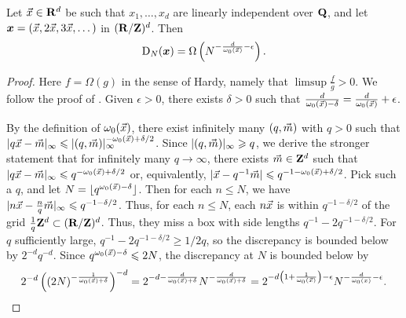 \begin{theorem}
Let $\vec{x}\in \mathbf{R}^d$ be such that $x_1,\dots,x_d$ are linearly independent over 
$\mathbf{Q}$, and let ${\boldsymbol x}=(\vec{x},2\vec{x},3\vec{x},\dots)$ in $(\mathbf{R}/\mathbf{Z})^d$. Then 
\[
	\operatorname{D}_N({\boldsymbol x}) = \Omega\left(N^{-\frac{d}{\omega_0(\vec{x})}-\epsilon} \right).
\]
\end{theorem}
\begin{proof}
Here $f=\Omega(g)$ in the sense of Hardy, namely that $\limsup \frac f g>0$. We 
follow the proof of \cite[Ch.~2, Th.~3.3]{kuipers-niederreiter-1974}. Given 
$\epsilon>0$, there exists $\delta>0$ such that 
$\frac{d}{\omega_0(\vec{x})-\delta} = \frac{d}{\omega_0(\vec{x})} + \epsilon$. 

By the definition of $\omega_0(\vec{x})$, there exist infinitely many 
$(q,\vec{m})$ with $q>0$ such that 
$|q \vec{x} - \vec{m}|_\infty \leqslant |(q,\vec{m})|_\infty^{-\omega_0(\vec{x})+\delta/2}$. 
Since $|(q,\vec{m})|_\infty \geqslant q$, we derive the stronger 
statement that for infinitely many $q\to \infty$, there exists 
$\vec{m}\in \mathbf{Z}^d$ such that 
$|q \vec{x}-\vec{m}|_\infty \leqslant q^{-\omega_0(\vec{x})+\delta/2}$ or, equivalently, 
$|\vec{x}-q^{-1}\vec{m}| \leqslant q^{-1-\omega_0(\vec{x})+\delta/2}$. Pick such a $q$, and 
let $N=\lfloor q^{\omega_0(\vec{x})-\delta}\rfloor$. Then for each $n\leqslant N$, we 
have $|n \vec{x} - \frac n q \vec{m}|_\infty \leqslant q^{-1-\delta/2}$. Thus, for each 
$n\leqslant N$, each $n \vec{x}$ is within $q^{-1-\delta/2}$ of the grid 
$\frac 1 q \mathbf{Z}^d\subset (\mathbf{R}/\mathbf{Z})^d$. Thus, they miss a box with side lengths 
$q^{-1} - 2 q^{-1-\delta/2}$. For $q$ sufficiently large, 
$q^{-1} - 2 q^{-1-\delta/2} \geqslant 1/2q$, so the discrepancy is 
bounded below by $2^{-d} q^{-d}$. Since $q^{\omega_0(\vec{x})-\delta} \leqslant 2 N$, 
the discrepancy at $N$ is bounded below by 
\[
	2^{-d} \left( (2 N)^{-\frac{1}{\omega_0(\vec{x})+\delta}}\right)^{-d} 
		= 2^{-d-\frac{d}{\omega_0(\vec{x})+\delta}} N^{-\frac{d}{\omega_0(\vec{x})+\delta}}
		= 2^{-d\left(1+\frac{1}{\omega_0(\vec{x})}\right)-\epsilon} N^{-\frac{d}{\omega_0(x)}-\epsilon} .
\]
\end{proof}
